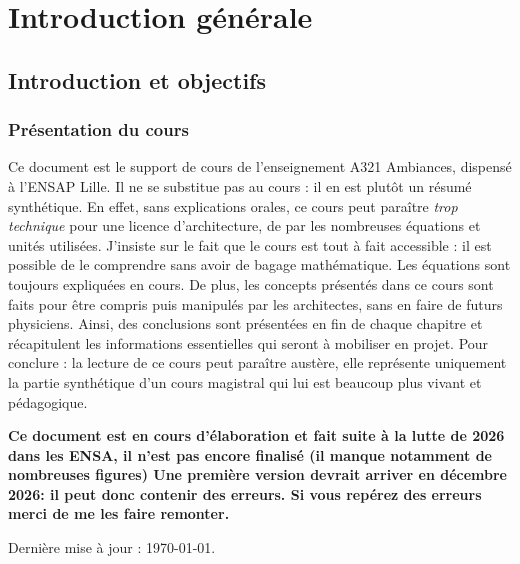 \part{Introduction générale}
\chapter{Introduction et objectifs}
\label{chap:introduction}

\section{Présentation du cours}
Ce document est le support de cours de l'enseignement A321 Ambiances, dispensé à l'ENSAP Lille. Il ne se substitue pas au cours : il en est plutôt un résumé synthétique. En effet, sans explications orales, ce cours peut paraître \textit{trop technique} pour une licence d'architecture, de par les nombreuses équations et unités utilisées. J'insiste sur le fait que le cours est tout à fait accessible : il est possible de le comprendre sans avoir de bagage mathématique. Les équations sont toujours expliquées en cours. De plus, les concepts présentés dans ce cours sont faits pour être compris puis manipulés par les architectes, sans en faire de futurs physiciens. Ainsi, des conclusions sont présentées en fin de chaque chapitre et récapitulent les informations essentielles qui seront à mobiliser en projet. Pour conclure : la lecture de ce cours peut paraître austère, elle représente uniquement la partie synthétique d'un cours magistral qui lui est beaucoup plus vivant et pédagogique.

\textbf{Ce document est en cours d'élaboration et fait suite à la lutte de 2026 dans les ENSA, il n'est pas encore finalisé (il manque notamment de nombreuses figures) Une première version devrait arriver en décembre 2026: il peut donc contenir des erreurs. Si vous repérez des erreurs merci de me les faire remonter.}

Dernière mise à jour : \today.

